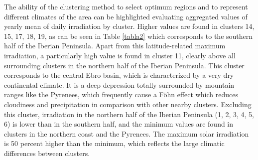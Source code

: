   
The ability of the clustering method to select optimum regions and to represent different climates of the area can be highlighted evaluating aggregated values of yearly mean of daily irradiation by cluster. Higher values are found in clusters 14, 15, 17, 18, 19, as can be seen in Table \ref{tabla2} which corresponds to the southern half of the Iberian Peninsula. Apart from this latitude-related maximum irradiation, a particularly high value is found in cluster 11, clearly above all surrounding clusters in the northern half of the Iberian Peninsula. This cluster corresponds to the central Ebro basin, which is characterized by a very dry continental climate. It is a deep depression totally surrounded by mountain ranges like the Pyrenees,  which frequently cause a Föhn effect which reduces cloudiness and precipitation in comparison with other nearby clusters. Excluding this cluster, irradiation in the northern half of the Iberian Peninsula (1, 2, 3, 4, 5, 6) is lower than in the southern half, and the minimum values are found in clusters in the northern coast and the Pyrenees. The maximum solar irradiation is 50 percent higher than the minimum, which reflects the large climatic differences between clusters.

